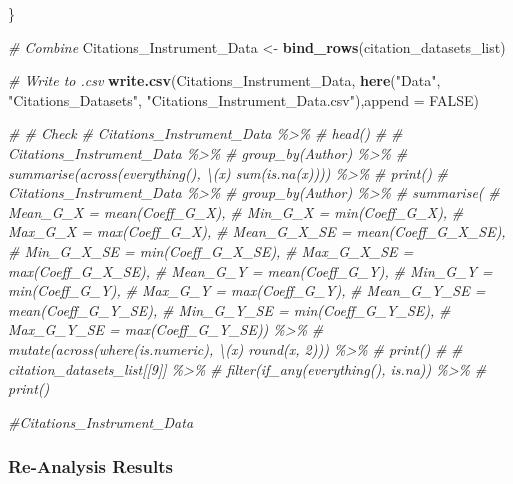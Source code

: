 \documentclass[
]{article}
\newenvironment{Shaded}{\begin{snugshade}}{\end{snugshade}}
\newcommand{\AttributeTok}[1]{\textcolor[rgb]{0.13,0.29,0.53}{#1}}
\newcommand{\CommentTok}[1]{\textcolor[rgb]{0.56,0.35,0.01}{\textit{#1}}}
\newcommand{\ConstantTok}[1]{\textcolor[rgb]{0.56,0.35,0.01}{#1}}
\newcommand{\FunctionTok}[1]{\textcolor[rgb]{0.13,0.29,0.53}{\textbf{#1}}}
\newcommand{\NormalTok}[1]{#1}
\newcommand{\OtherTok}[1]{\textcolor[rgb]{0.56,0.35,0.01}{#1}}
\newcommand{\StringTok}[1]{\textcolor[rgb]{0.31,0.60,0.02}{#1}}
\begin{document}
\begin{Shaded}
\begin{Highlighting}[]
\NormalTok{\}}


\CommentTok{\# Combine}
\NormalTok{Citations\_Instrument\_Data }\OtherTok{\textless{}{-}} \FunctionTok{bind\_rows}\NormalTok{(citation\_datasets\_list)}

\CommentTok{\# Write to .csv}
\FunctionTok{write.csv}\NormalTok{(Citations\_Instrument\_Data, }\FunctionTok{here}\NormalTok{(}\StringTok{"Data"}\NormalTok{, }\StringTok{"Citations\_Datasets"}\NormalTok{, }\StringTok{"Citations\_Instrument\_Data.csv"}\NormalTok{),}\AttributeTok{append =} \ConstantTok{FALSE}\NormalTok{)}

\CommentTok{\# \# Check}
\CommentTok{\# Citations\_Instrument\_Data \%\textgreater{}\%}
\CommentTok{\#   head()}
\CommentTok{\#   }
\CommentTok{\# Citations\_Instrument\_Data \%\textgreater{}\% }
\CommentTok{\#   group\_by(Author) \%\textgreater{}\% }
\CommentTok{\#   summarise(across(everything(), \textbackslash{}(x) sum(is.na(x)))) \%\textgreater{}\% }
\CommentTok{\#   print()}
\CommentTok{\# Citations\_Instrument\_Data \%\textgreater{}\%}
\CommentTok{\#   group\_by(Author) \%\textgreater{}\% }
\CommentTok{\#   summarise(}
\CommentTok{\#     Mean\_G\_X = mean(Coeff\_G\_X),}
\CommentTok{\#     Min\_G\_X = min(Coeff\_G\_X),}
\CommentTok{\#     Max\_G\_X = max(Coeff\_G\_X),}
\CommentTok{\#     Mean\_G\_X\_SE = mean(Coeff\_G\_X\_SE),}
\CommentTok{\#     Min\_G\_X\_SE = min(Coeff\_G\_X\_SE),}
\CommentTok{\#     Max\_G\_X\_SE = max(Coeff\_G\_X\_SE),}
\CommentTok{\#     Mean\_G\_Y = mean(Coeff\_G\_Y),}
\CommentTok{\#     Min\_G\_Y = min(Coeff\_G\_Y),}
\CommentTok{\#     Max\_G\_Y = max(Coeff\_G\_Y),}
\CommentTok{\#     Mean\_G\_Y\_SE = mean(Coeff\_G\_Y\_SE),}
\CommentTok{\#     Min\_G\_Y\_SE = min(Coeff\_G\_Y\_SE),}
\CommentTok{\#     Max\_G\_Y\_SE = max(Coeff\_G\_Y\_SE)) \%\textgreater{}\% }
\CommentTok{\#   mutate(across(where(is.numeric), \textbackslash{}(x) round(x, 2))) \%\textgreater{}\%}
\CommentTok{\#   print()}
\CommentTok{\# }
\CommentTok{\# citation\_datasets\_list[[9]] \%\textgreater{}\% }
\CommentTok{\#   filter(if\_any(everything(), is.na)) \%\textgreater{}\% }
\CommentTok{\#   print()}

\CommentTok{\#Citations\_Instrument\_Data}
\end{Highlighting}
\end{Shaded}

\subsubsection{Re-Analysis Results}\label{re-analysis-results}
\end{document}
